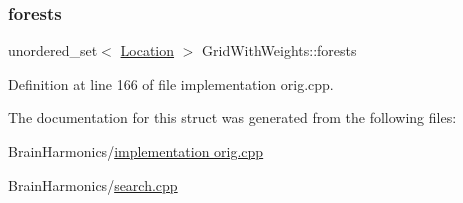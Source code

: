 \subsubsection{\texorpdfstring{forests}{forests}}
{\footnotesize\ttfamily unordered\+\_\+set$<$ \hyperlink{struct_square_grid_a2c9a2cbd3912aa48ac97289abc3f1c0f}{Location} $>$ Grid\+With\+Weights\+::forests}



Definition at line 166 of file implementation orig.\+cpp.



The documentation for this struct was generated from the following files\+:\begin{DoxyCompactItemize}
\item 
Brain\+Harmonics/\hyperlink{implementation_01orig_8cpp}{implementation orig.\+cpp}\item 
Brain\+Harmonics/\hyperlink{search_8cpp}{search.\+cpp}\end{DoxyCompactItemize}
